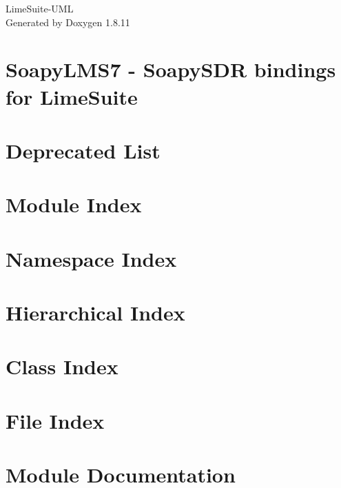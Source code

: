 \documentclass[twoside]{article}
\newcommand{\+}{\discretionary{\mbox{\scriptsize$\hookleftarrow$}}{}{}}
\begin{document}
\begin{titlepage}
\vspace*{7cm}
\begin{center}%
{\Large Lime\+Suite-\/\+U\+ML }\\
\vspace*{1cm}
{\large Generated by Doxygen 1.8.11}\\
\end{center}
\end{titlepage}
\tableofcontents
{}

\section{Soapy\+L\+M\+S7 -\/ Soapy\+S\+DR bindings for Lime\+Suite}
\label{md__home_erik_prefix_default_src_limesuite-dev_SoapyLMS7_README}

\section{Deprecated List}
\label{deprecated}

\section{Module Index}

\section{Namespace Index}

\section{Hierarchical Index}

\section{Class Index}

\section{File Index}

\section{Module Documentation}








\end{document}
